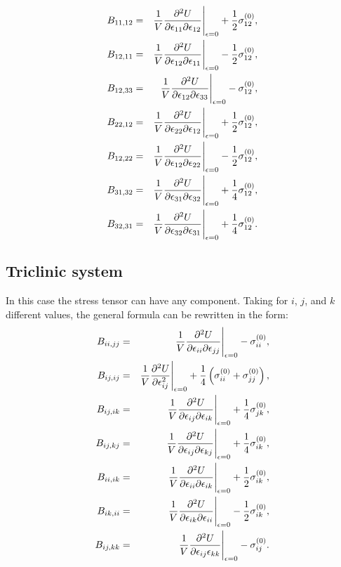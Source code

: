 \documentclass[12pt,a4paper]{article}
\begin{document}
\begin{eqnarray}
B_{11,12} &=& {1 \over V}{\partial^2 U \over \partial \epsilon_{11}
\partial \epsilon_{12}}\Bigg|_{\epsilon=0} +{1\over 2}\sigma^{(0)}_{12}, \\
B_{12,11} &=& {1 \over V}{\partial^2 U \over \partial \epsilon_{12}
\partial \epsilon_{11}}\Bigg|_{\epsilon=0} -{1\over 2}\sigma^{(0)}_{12}, \\
B_{12,33} &=& {1 \over V}{\partial^2 U \over \partial \epsilon_{12}
\partial \epsilon_{33}}\Bigg|_{\epsilon=0} -\sigma^{(0)}_{12}, \\
B_{22,12} &=& {1 \over V}{\partial^2 U \over \partial \epsilon_{22}
\partial \epsilon_{12}}\Bigg|_{\epsilon=0} +{1\over 2}\sigma^{(0)}_{12}, \\
B_{12,22} &=& {1 \over V}{\partial^2 U \over \partial \epsilon_{12}
\partial \epsilon_{22}}\Bigg|_{\epsilon=0} -{1\over 2}\sigma^{(0)}_{12}, \\
B_{31,32} &=& {1 \over V}{\partial^2 U \over \partial \epsilon_{31}
\partial \epsilon_{32}}\Bigg|_{\epsilon=0} + {1\over 4}\sigma^{(0)}_{12}, \\
B_{32,31} &=& {1 \over V}{\partial^2 U \over \partial \epsilon_{32}
\partial \epsilon_{31}}\Bigg|_{\epsilon=0} +{1\over 4}\sigma^{(0)}_{12}. 
\end{eqnarray}

\subsection{\color{web-blue}Triclinic system}
In this case the stress tensor can have any component. 
Taking for $i$, $j$, and $k$ different values, the general formula can 
be rewritten in the form:
\begin{eqnarray}
B_{ii,jj} &=& {1 \over V}{\partial^2 U \over \partial \epsilon_{ii}
\partial \epsilon_{jj}}\Bigg|_{\epsilon=0} - \sigma^{(0)}_{ii}, \\
B_{ij,ij} &=& {1 \over V}{\partial^2 U \over \partial \epsilon_{ij}^2 
}\Bigg|_{\epsilon=0} + {1\over 4} \left(\sigma^{(0)}_{ii} 
+ \sigma^{(0)}_{jj}\right), \\
B_{ij,ik} &=& {1 \over V}{\partial^2 U \over \partial \epsilon_{ij} 
\partial \epsilon_{ik}}\Bigg|_{\epsilon=0} +{1\over 4}\sigma^{(0)}_{jk}, \\
B_{ij,kj} &=& {1 \over V}{\partial^2 U \over \partial \epsilon_{ij} 
\partial \epsilon_{kj}}\Bigg|_{\epsilon=0} +{1\over 4} \sigma^{(0)}_{ik}, \\
B_{ii,ik} &=& {1 \over V}{\partial^2 U \over \partial \epsilon_{ii} 
\partial \epsilon_{ik}}\Bigg|_{\epsilon=0} +{1\over 2} \sigma^{(0)}_{ik}, \\
B_{ik,ii} &=& {1 \over V}{\partial^2 U \over \partial \epsilon_{ik} 
\partial \epsilon_{ii}}\Bigg|_{\epsilon=0} -{1\over 2} \sigma^{(0)}_{ik}, \\
B_{ij,kk} &=& {1 \over V}{\partial^2 U \over \partial \epsilon_{ij}
\epsilon_{kk} }\Bigg|_{\epsilon=0} - \sigma^{(0)}_{ij}. 
\end{eqnarray}
\end{document}
